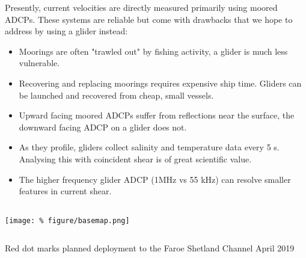 \documentclass[unknownkeysallowed,usepdftitle=false]{beamer}
\newcommand{\secvariable}{nothing}
\newcommand{\mysection}[1]{\renewcommand{\secvariable}{#1}
}
\begin{document}
\mysection{rationale}
\begin{frame}\label{\secvariable}

\vspace*{-5.2mm}
\begin{columns}
\begin{column}[t]{0.9\textwidth}

Presently, current velocities are directly measured primarily using moored ADCPs. These systems are reliable but come with drawbacks that we hope to address by using a glider instead:

\begin{itemize}
\item Moorings are often "trawled out" by fishing activity, a glider is much less vulnerable.
\item Recovering and replacing moorings requires expensive ship time. Gliders can be launched and recovered from cheap, small vessels.
\item Upward facing moored ADCPs suffer from reflections near the surface, the downward facing ADCP on a glider does not.
\item As they profile, gliders collect  salinity and temperature data every 5 s. Analysing this with coincident shear is of great scientific value.
\item The higher frequency glider ADCP (1MHz vs 55 kHz) can resolve smaller features in current shear. \hyperlink{tech}{}
\end{itemize}
\end{column}
\end{columns}



  
\end{frame}
\mysection{plan}
\begin{frame}\label{\secvariable} %
\vspace{-0.3cm}
\begin{center}
\texttt{[image: \%
figure/basemap.png]}
\end{center}
\begin{columns}
\begin{column}[t]{0.9\textwidth}
Red dot marks planned deployment to the Faroe Shetland Channel April 2019 \hyperlink{dep_details}{} \hyperlink{fsc_shear}{}
\end{column}
\end{columns}
\end{frame}
\end{document}
